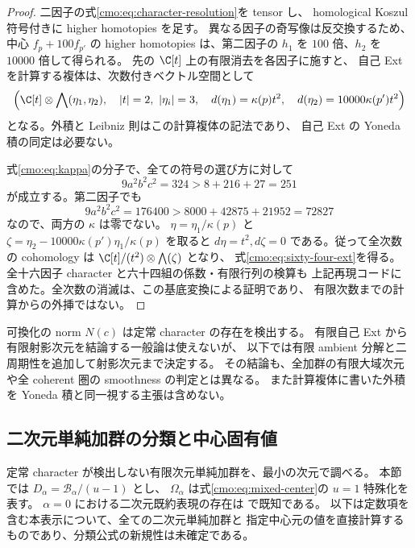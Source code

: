 \begin{proof}
二因子の式\eqref{cmo:eq:character-resolution}を tensor し、
homological Koszul 符号付きに higher homotopies を足す。
異なる因子の奇写像は反交換するため、
中心 $f_p+100f_{p'}$ の higher homotopies は、第二因子の
$h_1$ を $100$ 倍、$h_2$ を $10000$ 倍して得られる。
先の $\C[t]$ 上の有限消去を各因子に施すと、
自己 Ext を計算する複体は、次数付きベクトル空間として
\begin{equation}\label{cmo:eq:two-character-complex}
 \left(\C[t]\otimes\bigwedge(\eta_1,\eta_2),\quad
 |t|=2,\ |\eta_i|=3,\quad
 d(\eta_1)=\kappa(p)t^2,\quad
 d(\eta_2)=10000\kappa(p')t^2\right)
\end{equation}
となる。外積と Leibniz 則はこの計算複体の記法であり、
自己 Ext の Yoneda 積の同定は必要ない。

式\eqref{cmo:eq:kappa}の分子で、全ての符号の選び方に対して
\[
 9a^2b^2c^2=324>8+216+27=251
\]
が成立する。第二因子でも
\[
 9a^2b^2c^2=176400>8000+42875+21952=72827
\]
なので、両方の $\kappa$ は零でない。
$\eta=\eta_1/\kappa(p)$ と
$\zeta=\eta_2-10000\kappa(p')\eta_1/\kappa(p)$ を取ると
$d\eta=t^2,d\zeta=0$ である。従って全次数の cohomology は
$\C[t]/(t^2)\otimes\bigwedge(\zeta)$ となり、
式\eqref{cmo:eq:sixty-four-ext}を得る。
全十六因子 character と六十四組の係数・有限行列の検算も
上記再現コードに含めた。全次数の消滅は、この基底変換による証明であり、
有限次数までの計算からの外挿ではない。
\end{proof}

\begin{remark}
\label{cmo:rem:self-ext-scope}
可換化の norm $N(c)$ は定常 character の存在を検出する。
有限自己 Ext から有限射影次元を結論する一般論は使えないが、
以下では有限 ambient 分解と二周期性を追加して射影次元まで決定する。
その結論も、全加群の有限大域次元や全 coherent 圏の smoothness の判定とは異なる。
また計算複体に書いた外積を Yoneda 積と同一視する主張は含めない。
\end{remark}

\subsection{二次元単純加群の分類と中心固有値}
\label{cmo:subsec:two-dimensional}

定常 character が検出しない有限次元単純加群を、最小の次元で調べる。
本節では $D_\alpha=\mathcal B_\alpha/(u-1)$ とし、
$\Omega_\alpha$ は式\eqref{cmo:eq:mixed-center}の $u=1$ 特殊化を表す。
$\alpha=0$ における二次元既約表現の存在は
\cite[Proposition~4.1]{CMOWaltonRepresentations}で既知である。
以下は定数項を含む本表示について、全ての二次元単純加群と
指定中心元の値を直接計算するものであり、分類公式の新規性は未確定である。

